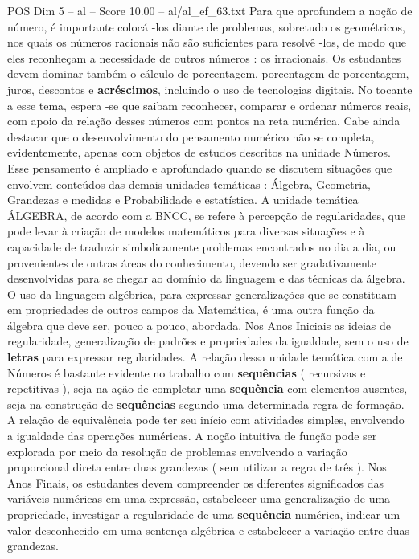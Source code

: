 \begin{textsample}{POS Dim 5 – al – Score 10.00 – al/al\_ef\_63.txt}
Para que aprofundem a noção de número, é importante colocá -los diante de problemas, sobretudo os geométricos, nos quais os números racionais não são suficientes para resolvê -los, de modo que eles reconheçam a necessidade de outros números : os irracionais.
Os estudantes devem dominar também o cálculo de porcentagem, porcentagem de porcentagem, juros, descontos e \textbf{acréscimos}, incluindo o uso de tecnologias digitais.
No tocante a esse tema, espera -se que saibam reconhecer, comparar e ordenar números reais, com apoio da relação desses números com pontos na reta numérica.
Cabe ainda destacar que o desenvolvimento do pensamento numérico não se completa, evidentemente, apenas com objetos de estudos descritos na unidade Números.
Esse pensamento é ampliado e aprofundado quando se discutem situações que envolvem conteúdos das demais unidades temáticas : Álgebra, Geometria, Grandezas e medidas e Probabilidade e estatística.
A unidade temática ÁLGEBRA, de acordo com a BNCC, se refere à percepção de regularidades, que pode levar à criação de modelos matemáticos para diversas situações e à capacidade de traduzir simbolicamente problemas encontrados no dia a dia, ou provenientes de outras áreas do conhecimento, devendo ser gradativamente desenvolvidas para se chegar ao domínio da linguagem e das técnicas da álgebra.
O uso da linguagem algébrica, para expressar generalizações que se constituam em propriedades de outros campos da Matemática, é uma outra função da álgebra que deve ser, pouco a pouco, abordada.
Nos Anos Iniciais as ideias de regularidade, generalização de padrões e propriedades da igualdade, sem o uso de \textbf{letras} para expressar regularidades.
A relação dessa unidade temática com a de Números é bastante evidente no trabalho com \textbf{sequências} ( recursivas e repetitivas ), seja na ação de completar uma \textbf{sequência} com elementos ausentes, seja na construção de \textbf{sequências} segundo uma determinada regra de formação.
A relação de equivalência pode ter seu início com atividades simples, envolvendo a igualdade das operações numéricas.
A noção intuitiva de função pode ser explorada por meio da resolução de problemas envolvendo a variação proporcional direta entre duas grandezas ( sem utilizar a regra de três ).
Nos Anos Finais, os estudantes devem compreender os diferentes significados das variáveis numéricas em uma expressão, estabelecer uma generalização de uma propriedade, investigar a regularidade de uma \textbf{sequência} numérica, indicar um valor desconhecido em uma sentença algébrica e estabelecer a variação entre duas grandezas.

\end{textsample}
